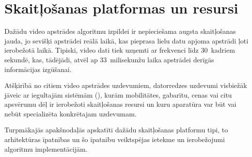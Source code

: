 \section{Skaitļošanas platformas un resursi} \label{sec:proc}
Dažādu video apstrādes algoritmu izpildei ir nepieciešama
augsta skaitļošanas jauda, jo sevišķi apstrādei reālā laikā, kas pieprasa
lielu datu apjoma apstrādi ļoti ierobežotā laikā. Tipiski, video dati
tiek uzņemti ar frekvenci līdz 30~kadriem sekundē, kas, tādējādi, atvēl ap
33~milisekunžu laika apstrādei derīgās informācijas izgūšanai.

Atšķirībā no citiem video apstrādes uzdevumiem, datorredzes uzdevumi 
visbiežāk jāveic ar iegultajām sistēmām (),
kurām mobilitātes, gabarītu, cenas vai citu apsvērumu dēļ ir ierobežoti
skaitļošanas resursi un kuru aparatūra var būt vai nebūt specializēta
konkrētajam uzdevumam.

Turpmākajās apakšnodaļās apskatīti dažādu skaitļošanas platformu tipi,
to arhitektūras īpatnības un šo īpatnību veiktspējas ietekme un ierobežojumi
algoritmu implementācijām.







